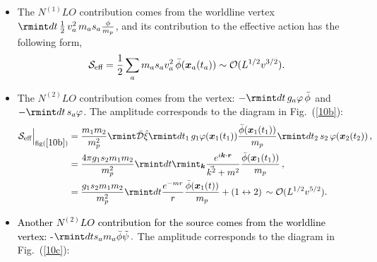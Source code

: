 \begin{itemize}
\begin{figure}
\begin{subfigure}[t]{0.22\textwidth}
\caption{}
\label{10g}
\end{subfigure}
\caption{Radiative diagrams for the scalar field that contribute up to $N^{(4)}LO$.}
\label{Figure10}
\end{figure}
\item The $N^{(1)}LO$ contribution comes from the worldline vertex $\rmint dt\, \frac{1}{2}\,v_a^2\, m_as_a \frac{\phi}{m_p}$, and its contribution to the effective action has the following form,
\begin{align}
    \begin{split}
        \mathcal{S}_{\text{eff}}=\frac{1}{2}\sum_{a}m_a s_a v_a^2\,\Bar{\phi}(\boldsymbol{x}_a(t_a))\sim \mathcal{O}(L^{1/2}v^{3/2}).
    \end{split}
\end{align}

\item The $N^{(2)}LO$ contribution comes from the vertex: $-\rmint dt\, g_a \varphi\, \Bar{\phi}$ and $-\rmint dt\,s_a \varphi$. The amplitude corresponds to the diagram in Fig.~(\ref{10b}):
\begin{align}
    \begin{split}
          \mathcal{S}_{\text{eff}}\Big|_{\text{fig}(\ref{10b})}&=\frac{m_1 m_2}{m_p^2}\rmint\Bar{\mathcal{D}}\Hat{\xi}\rmint dt_1\,g_1 \varphi(\boldsymbol{x}_1(t_1))\frac{\Bar{\phi}(\boldsymbol{x}_1(t_1))}{m_p}\rmint dt_2\,s_2\,\varphi(\boldsymbol{x}_2(t_2))\,,\\ &
        =\frac{4 \pi  g_1 s_2 m_1 m_2}{m_p^2} \rmint dt\rmint_{\boldsymbol{k}}\frac{e^{i\boldsymbol{k}\cdot \boldsymbol{r}}}{\Vec{k^2}+m^2}\frac{\Bar{\phi}(\boldsymbol{x}_1(t_1))}{m_p}\,,\\ &
        =\frac{g_1 s_2 m_1 m_2}{m_p^2}\rmint dt \frac{e^{-mr}}{r}\frac{\Bar{\phi}(\boldsymbol{x}_1(t))}{m_p}+(1\leftrightarrow 2)\,\sim\mathcal{O}(L^{1/2}v^{5/2}).
    \end{split}
\end{align}

\item \textcolor{black}{Another $N^{(2)}LO$ contribution for the source comes from the worldline vertex:
-$\rmint dts_a m_a\bar{\phi}\tilde{\psi}\,.$}
The amplitude corresponds to the diagram in Fig.~(\ref{10c}):


\end{itemize}
